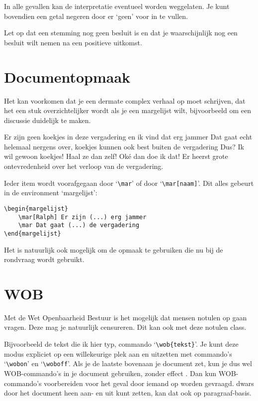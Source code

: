 \documentclass[a4paper]{notulen}
\begin{document}
		In alle gevallen kan de interpretatie eventueel worden weggelaten. Je kunt bovendien een getal negeren door er `geen' voor in te vullen.
		
		Let op dat een stemming nog geen besluit is en dat je waarschijnlijk nog een besluit wilt nemen na een positieve uitkomst.
	
	\section{Documentopmaak}
		Het kan voorkomen dat je een dermate complex verhaal op moet schrijven,
		dat het een stuk overzichtelijker wordt als je een margelijst wilt, bijvoorbeeld om
		een discussie duidelijk te maken.
		
		
		\begin{margelijst}	
			\mar[Ralph] Er zijn geen koekjes in deze vergadering en ik vind dat erg jammer
			\mar Dat gaat echt helemaal nergens over, koekjes kunnen ook best buiten de vergadering
			\mar[Ralph] Dus? Ik wil gewoon koekjes!
			\mar[\ab] Haal ze dan zelf!
			\mar[Ralph] Ok\'e dan doe ik dat!
			\mar Er heerst grote ontevredenheid over het verloop van de vergadering.
		\end{margelijst}
		
		Ieder item wordt voorafgegaan door `\lstinline!\mar!' of door `\lstinline!\mar[naam]!'. Dit alles gebeurt in
		de environment `margelijst':
		
		\begin{lstlisting}
\begin{margelijst}	
	\mar[Ralph] Er zijn (...) erg jammer
	\mar Dat gaat (...) de vergadering
\end{margelijst}
		\end{lstlisting}
		
		Het is natuurlijk ook mogelijk om de opmaak te gebruiken die nu bij de rondvraag wordt gebruikt.
		
	\section{WOB}
		Met de Wet Openbaarheid Bestuur is het mogelijk dat mensen notulen op gaan vragen. Deze mag je natuurlijk censureren. Dit kan ook met deze notulen class.
		
		Bijvoorbeeld de tekst die ik hier typ,  commando `\lstinline!\wob{tekst}!'. Je kunt deze modus expliciet op een willekeurige plek aan en uitzetten met  commando's `\lstinline!\wobon!' en `\lstinline!\woboff!'. Als je de laatste bovenaan je document zet, kun je dus wel WOB-commando's in je document gebruiken, zonder  effect . Dan kun  WOB-commando's  voorbereiden voor het geval  door iemand op worden gevraagd.  dwars door het document heen aan- en uit kunt zetten, kan dat ook op paragraaf-basis.
		
\end{document}
